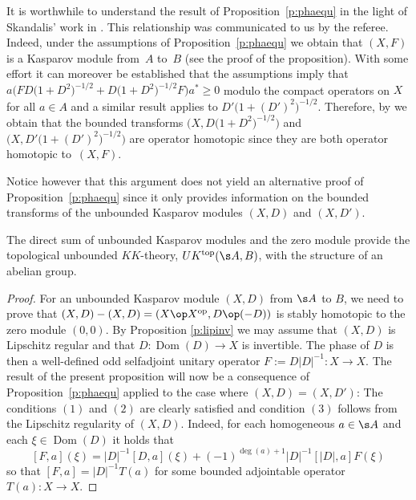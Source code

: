 \begin{rem}It is worthwhile to understand the result of Proposition~\ref{p:phaequ} in the light of Skandalis' work in \cite{Ska:SRK}. This relationship was communicated to us by the referee. Indeed, under the assumptions of Proposition~\ref{p:phaequ} we obtain that $(X,F)$ is a Kasparov module from~$A$ to~$B$ (see the proof of the proposition). With some effort it can moreover be established that the assumptions imply that $a \big( F D\big(1 + D^2\big)^{-1/2} + D\big(1 + D^2\big)^{-1/2} F\big)a^* \geq 0$ modulo the compact operators on $X$ for all $a \in A$ and a similar result applies to $D'\big(1 + (D')^2\big)^{-1/2}$. Therefore, by \cite[Lemma~11]{Ska:SRK} we obtain that the bounded transforms $\big(X,D\big(1+D^2\big)^{-1/2}\big)$ and $\big(X,D'\big(1 + (D')^2\big)^{-1/2}\big)$ are operator homotopic since they are both operator homotopic to~$(X,F)$.

Notice however that this argument does not yield an alternative proof of Proposition~\ref{p:phaequ} since it only provides information on the bounded transforms of the unbounded Kasparov modules $(X,D)$ and $(X,D')$.
\end{rem}

\begin{Theorem}\label{t:group}The direct sum of unbounded Kasparov modules and the zero module provide the topological unbounded $KK$-theory, $UK^{{\rm top}}(\s A,B)$, with the structure of an abelian group.
\end{Theorem}
\begin{proof}For an unbounded Kasparov module $(X,D)$ from $\s A$ to $B$, we need to prove that $(X,D) - (X,D) = (X \op X^{{\rm op}}, D \op (-D))$ is stably homotopic to the zero module $(0,0)$. By Proposition \ref{p:lipinv} we may assume that $(X,D)$ is Lipschitz regular and that $D \colon \operatorname{Dom}(D) \to X$ is invertible. The phase of $D$ is then a well-defined odd selfadjoint unitary operator $F := D |D|^{-1}\colon X \to X$. The result of the present proposition will now be a consequence of Proposition~\ref{p:phaequ} applied to the case where $(X,D) = (X,D')$: The conditions $(1)$ and $(2)$ are clearly satisfied and condition $(3)$ follows from the Lipschitz regularity of $(X,D)$. Indeed, for each homogeneous $a \in \s A$ and each $\xi \in \operatorname{Dom}(D)$ it holds that
\[
[F,a](\xi) = |D|^{-1} [D,a](\xi) + (-1)^{\deg (a) + 1} |D|^{-1} [ |D|,a ] F(\xi)
\]
so that $[F,a] = |D|^{-1} T(a)$ for some bounded adjointable operator $T(a)\colon X \to X$.
\end{proof}


